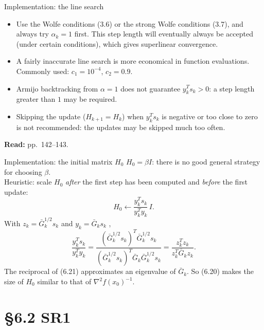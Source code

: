 \documentclass[aspectratio=169,12pt]{beamer}
\newcommand{\hessf}{\nabla^{2} f}
\newcommand{\Gbar}{\bar{G}}
\newcommand{\la}{\leftarrow}
\newcommand{\eqn}[1]{\text{\small(#1)}}
\newcommand{\readbook}[1]{{\color{red}\textbf{Read:} #1}}
\begin{document}
\begin{frame}{Implementation: the line search}
  \begin{itemize}\setlength\itemsep{0.7em}
    \item Use the Wolfe conditions (3.6) or the strong Wolfe conditions (3.7), and
      \alert{always try $\alpha_{k}=1$ first}. This step length will eventually always be accepted
      (under certain conditions), which gives superlinear convergence.
    \item A fairly inaccurate line search is more economical in function evaluations.
      Commonly used: $c_{1}=10^{-4}$, $c_{2}=0.9$.
    \item Armijo backtracking from $\alpha=1$ does not guarantee $y_{k}^{T}s_{k}>0$: a step length
      greater than $1$ may be required.
    \item Skipping the update ($H_{k+1}=H_{k}$) when $y_{k}^{T}s_{k}$ is negative or too close to zero
      is \alert{not recommended}: the updates may be skipped much too often.
  \end{itemize}

  \vspace{0.5em}
  \readbook{pp.~142--143.}
\end{frame}

\begin{frame}{Implementation: the initial matrix $H_{0}$}
  $H_{0}=\beta I$: there is no good general strategy for choosing $\beta$.\\[0.3em]
  Heuristic: scale $H_{0}$ \emph{after} the first step has been computed and \emph{before} the
  first update:
  \[ H_{0}\la\frac{y_{k}^{T}s_{k}}{y_{k}^{T}y_{k}}\,I . \tag{6.20} \]
  With $z_{k}=\Gbar_{k}^{1/2}s_{k}$ and $y_{k}=\Gbar_{k}s_{k}$ \eqn{6.12},
  \[
    \frac{y_{k}^{T}s_{k}}{y_{k}^{T}y_{k}}
    =\frac{(\Gbar_{k}^{1/2}s_{k})^{T}\Gbar_{k}^{1/2}s_{k}}{(\Gbar_{k}^{1/2}s_{k})^{T}\Gbar_{k}\Gbar_{k}^{1/2}s_{k}}
    =\frac{z_{k}^{T}z_{k}}{z_{k}^{T}\Gbar_{k}z_{k}} .
    \tag{6.21}
  \]
  The reciprocal of (6.21) approximates an eigenvalue of $\Gbar_{k}$. So (6.20) makes the size
  of $H_{0}$ similar to that of $\hessf(x_{0})^{-1}$.
\end{frame}

\section{\S6.2 SR1}
\end{document}

